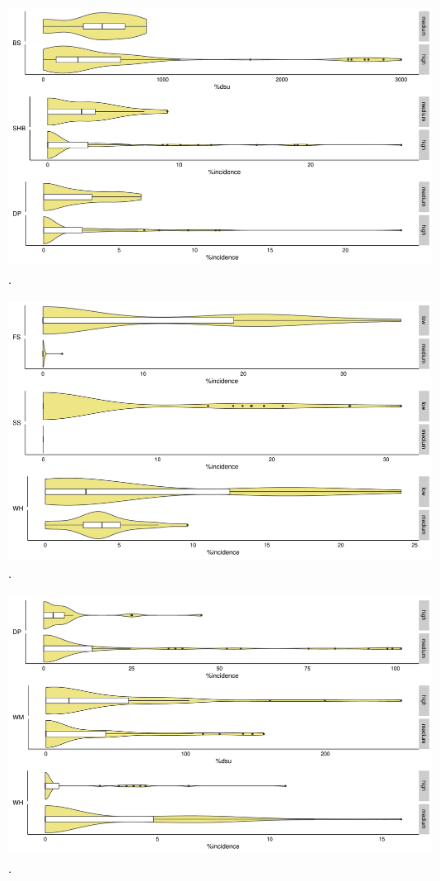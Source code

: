 \begin{figure}[h]
    \centering
        \includegraphics[width = 1\textwidth]{figures/CP_yield_box.pdf}
        \caption{.}
        \label{fig:yield.box_CP}
\end{figure}


\begin{figure}
        \includegraphics[width = 1\textwidth]{figures/OD_yield_box.pdf}
        \caption{.}
\label{fig:yield.box_OD}
\end{figure}

\begin{figure}
    \centering
        \includegraphics[width = 1\textwidth]{figures/RR_yield_box.pdf}
        \caption{.}
        \label{fig:yield.box_RR}
\end{figure}


